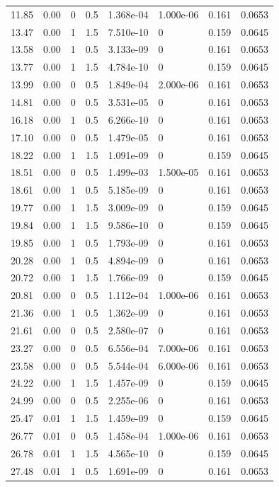 \documentclass[preview]{standalone}
\begin{document}
{{\begin{tabular}{L{1.2cm}C{1.2cm} C{0.3cm}C{0.5cm} C{1.4cm}C{1.4cm} C{1.4cm}C{1.4cm}}
  11.85  &  0.00  & 0     & 0.5 &  1.368e-04  & 1.000e-06  & 0.161 &  0.0653   \\ 
  13.47  &  0.00  & 1     & 1.5 &  7.510e-10  & 0  & 0.159 &  0.0645   \\ 
  13.58  &  0.00  & 1     & 0.5 &  3.133e-09  & 0  & 0.161 &  0.0653   \\ 
  13.77  &  0.00  & 1     & 1.5 &  4.784e-10  & 0  & 0.159 &  0.0645   \\ 
  13.99  &  0.00  & 0     & 0.5 &  1.849e-04  & 2.000e-06  & 0.161 &  0.0653   \\ 
  14.81  &  0.00  & 0     & 0.5 &  3.531e-05  & 0  & 0.161 &  0.0653   \\ 
  16.18  &  0.00  & 1     & 0.5 &  6.266e-10  & 0  & 0.161 &  0.0653   \\ 
  17.10  &  0.00  & 0     & 0.5 &  1.479e-05  & 0  & 0.161 &  0.0653   \\ 
  18.22  &  0.00  & 1     & 1.5 &  1.091e-09  & 0  & 0.159 &  0.0645   \\ 
  18.51  &  0.00  & 0     & 0.5 &  1.499e-03  & 1.500e-05  & 0.161 &  0.0653   \\ 
  18.61  &  0.00  & 1     & 0.5 &  5.185e-09  & 0  & 0.161 &  0.0653   \\ 
  19.77  &  0.00  & 1     & 1.5 &  3.009e-09  & 0  & 0.159 &  0.0645   \\ 
  19.84  &  0.00  & 1     & 1.5 &  9.586e-10  & 0  & 0.159 &  0.0645   \\ 
  19.85  &  0.00  & 1     & 0.5 &  1.793e-09  & 0  & 0.161 &  0.0653   \\ 
  20.28  &  0.00  & 1     & 0.5 &  4.894e-09  & 0  & 0.161 &  0.0653   \\ 
  20.72  &  0.00  & 1     & 1.5 &  1.766e-09  & 0  & 0.159 &  0.0645   \\ 
  20.81  &  0.00  & 0     & 0.5 &  1.112e-04  & 1.000e-06  & 0.161 &  0.0653   \\ 
  21.36  &  0.00  & 1     & 0.5 &  1.362e-09  & 0  & 0.161 &  0.0653   \\ 
  21.61  &  0.00  & 0     & 0.5 &  2.580e-07  & 0  & 0.161 &  0.0653   \\ 
  23.27  &  0.00  & 0     & 0.5 &  6.556e-04  & 7.000e-06  & 0.161 &  0.0653   \\ 
  23.58  &  0.00  & 0     & 0.5 &  5.544e-04  & 6.000e-06  & 0.161 &  0.0653   \\ 
  24.22  &  0.00  & 1     & 1.5 &  1.457e-09  & 0  & 0.159 &  0.0645   \\ 
  24.99  &  0.00  & 0     & 0.5 &  2.255e-06  & 0  & 0.161 &  0.0653   \\ 
  25.47  &  0.01  & 1     & 1.5 &  1.459e-09  & 0  & 0.159 &  0.0645   \\ 
  26.77  &  0.01  & 0     & 0.5 &  1.458e-04  & 1.000e-06  & 0.161 &  0.0653   \\ 
  26.78  &  0.01  & 1     & 1.5 &  4.565e-10  & 0  & 0.159 &  0.0645   \\ 
  27.48  &  0.01  & 1     & 0.5 &  1.691e-09  & 0  & 0.161 &  0.0653   \\ 
\hline 
\end{tabular} 

}}
\end{document}
